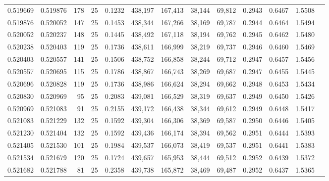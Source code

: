 \begin{tabular}{rrrrrrrrrrrrr}
0.519669 & 0.519876 &   178 &  25 &                                     0.1232 & 438,197 & 167,413 &  38,144 &  69,812 & 0.2943 & 0.6467 & 1.5508 \\
0.519876 & 0.520052 &   147 &  25 &                                     0.1453 & 438,344 & 167,266 &  38,169 &  69,787 & 0.2944 & 0.6464 & 1.5494 \\
0.520052 & 0.520237 &   148 &  25 &                                     0.1445 & 438,492 & 167,118 &  38,194 &  69,762 & 0.2945 & 0.6462 & 1.5480 \\
0.520238 & 0.520403 &   119 &  25 &                                     0.1736 & 438,611 & 166,999 &  38,219 &  69,737 & 0.2946 & 0.6460 & 1.5469 \\
0.520403 & 0.520557 &   141 &  25 &                                     0.1506 & 438,752 & 166,858 &  38,244 &  69,712 & 0.2947 & 0.6457 & 1.5456 \\
0.520557 & 0.520695 &   115 &  25 &                                     0.1786 & 438,867 & 166,743 &  38,269 &  69,687 & 0.2947 & 0.6455 & 1.5445 \\
0.520696 & 0.520828 &   119 &  25 &                                     0.1736 & 438,986 & 166,624 &  38,294 &  69,662 & 0.2948 & 0.6453 & 1.5434 \\
0.520830 & 0.520969 &    95 &  25 &                                     0.2083 & 439,081 & 166,529 &  38,319 &  69,637 & 0.2949 & 0.6450 & 1.5426 \\
0.520969 & 0.521083 &    91 &  25 &                                     0.2155 & 439,172 & 166,438 &  38,344 &  69,612 & 0.2949 & 0.6448 & 1.5417 \\
0.521083 & 0.521229 &   132 &  25 &                                     0.1592 & 439,304 & 166,306 &  38,369 &  69,587 & 0.2950 & 0.6446 & 1.5405 \\
0.521230 & 0.521404 &   132 &  25 &                                     0.1592 & 439,436 & 166,174 &  38,394 &  69,562 & 0.2951 & 0.6444 & 1.5393 \\
0.521405 & 0.521530 &   101 &  25 &                                     0.1984 & 439,537 & 166,073 &  38,419 &  69,537 & 0.2951 & 0.6441 & 1.5383 \\
0.521534 & 0.521679 &   120 &  25 &                                     0.1724 & 439,657 & 165,953 &  38,444 &  69,512 & 0.2952 & 0.6439 & 1.5372 \\
0.521682 & 0.521788 &    81 &  25 &                                     0.2358 & 439,738 & 165,872 &  38,469 &  69,487 & 0.2952 & 0.6437 & 1.5365 \\

\end{tabular}
